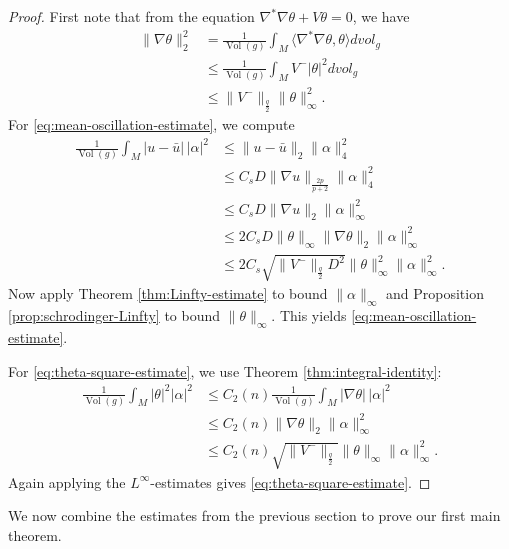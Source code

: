 \documentclass[12pt, twoside]{article}
\theoremstyle{definition}
\numberwithin{equation}{section}
\def \a {\alpha }
\def\na {\nabla}
\begin{document}
	\begin{proof}
		First note that from the equation \(\nabla^{*}\nabla\theta+V\theta=0\), we have
		\begin{align*}
		\|\nabla\theta\|_{2}^{2}
		&=\frac{1}{\operatorname{Vol}(g)}\int_{M}\langle\nabla^{*}\nabla\theta,\theta\rangle dvol_{g}\\
		&\le\frac{1}{\operatorname{Vol}(g)}\int_{M}V^{-}|\theta|^{2}dvol_{g}\\
		&\le\|V^{-}\|_{\frac{q}{2}}\|\theta\|_{\infty}^{2}.
		\end{align*}
		For \eqref{eq:mean-oscillation-estimate}, we compute
		\begin{align*}
		\frac{1}{\operatorname{Vol}(g)}\int_{M}|u-\bar{u}|\,|\alpha|^{2}
		&\le\|u-\bar{u}\|_{2}\|\alpha\|_{4}^{2} \\
		&\le C_{s}D\|\na u\|_{\frac{2p}{p+2} }\|\a\|^{2}_{4}\\
		&\le C_{s}D\|\nabla u\|_{2}\|\alpha\|_{\infty}^{2} \\
		&\le 2C_{s}D\|\theta\|_{\infty}\|\nabla\theta\|_{2}\|\alpha\|_{\infty}^{2} \\
		&\le 2C_{s}\sqrt{\|V^{-}\|_{\frac{q}{2}}D^{2}}\|\theta\|_{\infty}^{2}\|\alpha\|_{\infty}^{2}.
		\end{align*}    
		Now apply Theorem \ref{thm:Linfty-estimate} to bound \(\|\alpha\|_{\infty}\) and Proposition \ref{prop:schrodinger-Linfty} to bound \(\|\theta\|_{\infty}\). This yields \eqref{eq:mean-oscillation-estimate}.
		
		For \eqref{eq:theta-square-estimate}, we use Theorem \ref{thm:integral-identity}:
		\begin{align*}
		\frac{1}{\operatorname{Vol}(g)}\int_{M}|\theta|^{2}|\alpha|^{2}
		&\le C_{2}(n)\frac{1}{\operatorname{Vol}(g)}\int_{M}|\nabla\theta|\,|\alpha|^{2} \\
		&\le C_{2}(n)\|\nabla\theta\|_{2}\|\alpha\|_{\infty}^{2} \\
		&\le C_{2}(n)\sqrt{\|V^{-}\|_{\frac{q}{2}}}\|\theta\|_{\infty}\|\alpha\|_{\infty}^{2}.
		\end{align*}
		Again applying the \(L^{\infty}\)-estimates gives \eqref{eq:theta-square-estimate}.
	\end{proof}
	
	We now combine the estimates from the previous section to prove our first main theorem.
	
\end{document}
